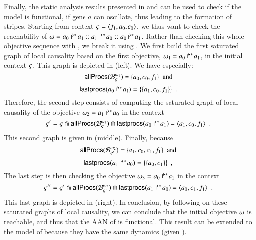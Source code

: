 Finally, the static analysis results presented in
 and  can be used to check if the model is functional,
\ie if gene $a$ can oscillate, thus leading to the formation of stripes.
Starting from context $\ctx = \PHstate{f_1, a_0, c_0}$,
we thus want to check the reachability of
$\w = \PHobj{a_0}{a_1} \PHconcat \PHobj{a_1}{a_0} \PHconcat \PHobj{a_0}{a_1}$.
Rather than checking this whole objective sequence with ,
we break it using .
We first build the first saturated graph of local causality
based on the first objective, $\w_1 = \PHobj{a_0}{a_1}$, in the initial context $\ctx$.
This graph is depicted in (left).
We have especially:
\[\allprocs(\thisB{\w_1}{\ctx}) = \{ a_0, c_0, f_1 \} \enspace \text{and}\]
\[\lastprocs(\PHobj{a_0}{a_1}) = \{\{ a_1, c_0, f_1 \}\} \enspace.\]
Therefore, the second step consists of computing the saturated graph of local causality
of the objective $\w_2 = \PHobj{a_1}{a_0}$
in the context
\[\ctx' = \ctx \Cap \allprocs(\thisB{\w_1}{\ctx}) \Cap \lastprocs(\PHobj{a_0}{a_1}) = \PHstate{a_1, c_0, f_1} \enspace.\]
This second graph is given in (middle).
Finally, because
\[\allprocs(\thisB{\w_2}{\ctx'}) = \{ a_1, c_0, c_1, f_1 \} \enspace \text{and}\]
\[\lastprocs(\PHobj{a_1}{a_0}) = \{\{ a_0, c_1 \}\} \enspace,\]
The last step is then checking
the objective $\w_3 = \PHobj{a_0}{a_1}$
in the context
\[\ctx'' = \ctx' \Cap \allprocs(\thisB{\w_2}{\ctx'}) \Cap \lastprocs(\PHobj{a_1}{a_0}) = \PHstate{a_0, c_1, f_1} \enspace.\]
This last graph is depicted in (right).
In conclusion, by following  on these saturated graphs of local causality,
we can conclude that the initial objective $\w$ is reachable,
and thus that the AAN of  is functional.
This result can be extended to the model of 
because they have the same dynamics (given ).


